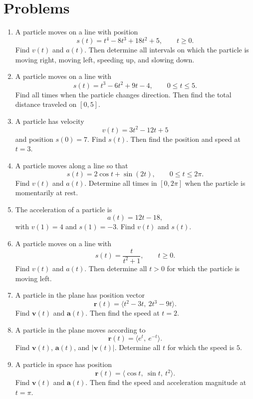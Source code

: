 \documentclass[12pt]{article}
\begin{document}
\section*{Problems}
\begin{enumerate}[leftmargin=*, itemsep=1em, topsep=0.8em]
  \item A particle moves on a line with position
  \[
  s(t)=t^4-8t^3+18t^2+5,\qquad t\ge 0.
  \]
  Find $v(t)$ and $a(t)$. Then determine all intervals on which the particle is moving right, moving left, speeding up, and slowing down.

  \item A particle moves on a line with
  \[
  s(t)=t^3-6t^2+9t-4,\qquad 0\le t\le 5.
  \]
  Find all times when the particle changes direction. Then find the total distance traveled on $[0,5]$.

  \item A particle has velocity
  \[
  v(t)=3t^2-12t+5
  \]
  and position $s(0)=7$. Find $s(t)$. Then find the position and speed at $t=3$.

  \item A particle moves along a line so that
  \[
  s(t)=2\cos t+\sin(2t),\qquad 0\le t\le 2\pi.
  \]
  Find $v(t)$ and $a(t)$. Determine all times in $[0,2\pi]$ when the particle is momentarily at rest.

  \item The acceleration of a particle is
  \[
  a(t)=12t-18,
  \]
  with $v(1)=4$ and $s(1)=-3$. Find $v(t)$ and $s(t)$.

  \item A particle moves on a line with
  \[
  s(t)=\frac{t}{t^2+1},\qquad t\ge 0.
  \]
  Find $v(t)$ and $a(t)$. Then determine all $t>0$ for which the particle is moving left.

  \item A particle in the plane has position vector
  \[
  \mathbf{r}(t)=\langle t^2-3t,\ 2t^3-9t\rangle.
  \]
  Find $\mathbf{v}(t)$ and $\mathbf{a}(t)$. Then find the speed at $t=2$.

  \item A particle in the plane moves according to
  \[
  \mathbf{r}(t)=\langle e^t,\ e^{-t}\rangle.
  \]
  Find $\mathbf{v}(t)$, $\mathbf{a}(t)$, and $|\mathbf{v}(t)|$. Determine all $t$ for which the speed is $5$.

  \item A particle in space has position
  \[
  \mathbf{r}(t)=\langle \cos t,\ \sin t,\ t^2\rangle.
  \]
  Find $\mathbf{v}(t)$ and $\mathbf{a}(t)$. Then find the speed and acceleration magnitude at $t=\pi$.


\end{enumerate}
\end{document}
